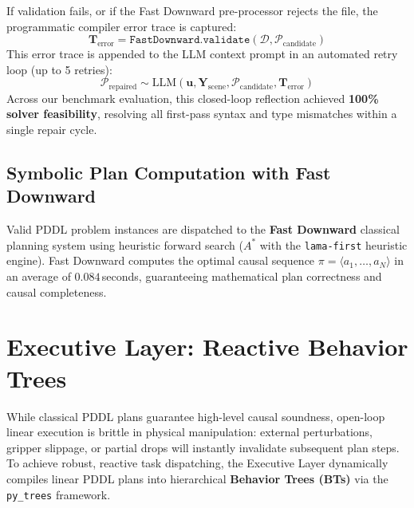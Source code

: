 \documentclass[conference]{IEEEtran}
\begin{document}
If validation fails, or if the Fast Downward pre-processor rejects the file, the programmatic compiler error trace is captured:
\begin{equation}
    \mathbf{T}_{\text{error}} = \texttt{FastDownward.validate}(\mathcal{D}, \mathcal{P}_{\text{candidate}})
\end{equation}
This error trace is appended to the LLM context prompt in an automated retry loop (up to 5 retries):
\begin{equation}
    \mathcal{P}_{\text{repaired}} \sim \text{LLM}(\mathbf{u}, \mathbf{Y}_{\text{scene}}, \mathcal{P}_{\text{candidate}}, \mathbf{T}_{\text{error}})
\end{equation}
Across our benchmark evaluation, this closed-loop reflection achieved \textbf{100\% solver feasibility}, resolving all first-pass syntax and type mismatches within a single repair cycle.

\subsection{Symbolic Plan Computation with Fast Downward}
Valid PDDL problem instances are dispatched to the \textbf{Fast Downward} classical planning system using heuristic forward search ($A^*$ with the \texttt{lama-first} heuristic engine). Fast Downward computes the optimal causal sequence $\pi = \langle a_1, \dots, a_N \rangle$ in an average of $\mathbf{0.084}$\,seconds, guaranteeing mathematical plan correctness and causal completeness.

\section{Executive Layer: Reactive Behavior Trees}
\label{sec:executive_layer}

While classical PDDL plans guarantee high-level causal soundness, open-loop linear execution is brittle in physical manipulation: external perturbations, gripper slippage, or partial drops will instantly invalidate subsequent plan steps. To achieve robust, reactive task dispatching, the Executive Layer dynamically compiles linear PDDL plans into hierarchical \textbf{Behavior Trees (BTs)} via the \texttt{py\_trees} framework.
\end{document}
